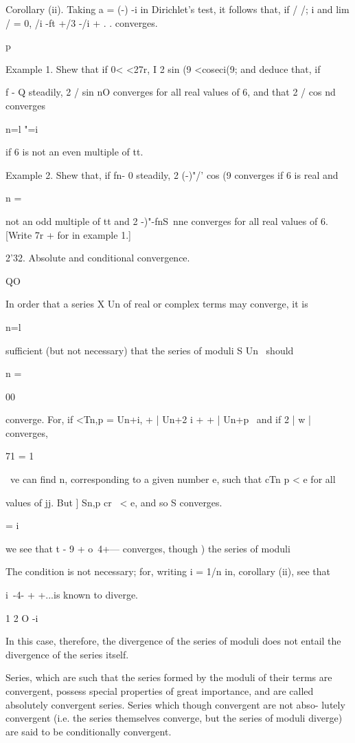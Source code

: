 Corollary (ii). Taking a = (-) -i in Dirichlet's test, it follows
that, if / /; i and lim / = 0, /i -ft +/3 -/i + . .  converges.

p

Example 1. Shew that if 0< <27r, I 2 sin (9 <coseci(9; and deduce
that, if

f - Q steadily, 2 / sin nO converges for all real values of 6, and
that 2 / cos nd converges

n=l "=i

if 6 is not an even multiple of tt.

Example 2. Shew that, if fn- 0 steadily, 2 (-)"/' cos (9 converges if
6 is real and

n = \

not an odd multiple of tt and 2 -)"-fnS\ nne converges for all real
values of 6. [Write 7r + for in example 1.]

2'32. Absolute and conditional convergence.

QO

In order that a series X Un of real or complex terms may converge, it
is

n=l

sufficient (but not necessary) that the series of moduli S Un \ should

n = \

00

converge. For, if <Tn,p = Un+i, + | Un+2 i +    + | Un+p \ and if
2 | w | converges,

71 = 1

\ ve can find n, corresponding to a given number e, such that cTn p <
e for all

values of jj. But ] Sn,p cr \ < e, and so S converges.

  = i

we see that t - 9 + o~4+--- converges, though ) the series of
moduli

The condition is not necessary; for, writing i = 1/n in,
corollary (ii), see that

i\ -4- + +...is known to diverge.

1 2 O -i

In this case, therefore, the divergence of the series of moduli does
not entail the divergence of the series itself.

Series, which are such that the series formed by the moduli of their
terms are convergent, possess special properties of great importance,
and are called absolutely convergent series. Series which though
convergent are not abso- lutely convergent (i.e. the series themselves
converge, but the series of moduli diverge) are said to be
conditionally convergent.

